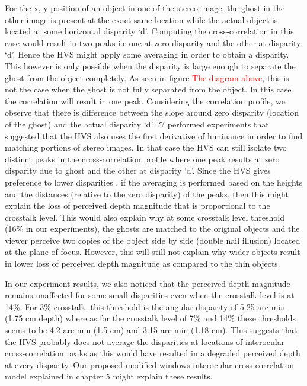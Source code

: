For the x, y position of an object in one of the stereo image, the ghost in the other image is present at the exact same location while the actual object is located at some horizontal disparity `d'. Computing the cross-correlation in this case would result in two peaks i.e one at zero disparity and the other at disparity `d'. Hence the HVS might apply some averaging in order to obtain a disparity. This however is only possible when the disparity is large enough to separate the ghost from the object completely. As seen in figure \textcolor{red}{The diagram above}, this is not the case when the ghost is not fully separated from the object. In this case the correlation will result in one peak. Considering the correlation profile, we observe that there is difference between the slope around zero disparity (location of the ghost) and the actual disparity `d'. ?? performed experiments that suggested that the HVS also uses the first derivative of luminance in order to find matching portions of stereo images. In that case the HVS can still isolate two distinct peaks in the cross-correlation profile where one peak results at zero disparity due to ghost and the other at disparity `d'. Since the HVS gives preference to lower disparities \cite{krol1980double}, if the averaging is performed based on the heights and the distances (relative to the zero disparity) of the peaks, then this might explain the loss of perceived depth magnitude that is proportional to the crosstalk level. This would also explain why at some crosstalk level threshold (16\% in our experiments), the ghosts are matched to the original objects and the viewer perceive two copies of the object side by side (double nail illusion) located at the plane of focus. However, this will still not explain why wider objects result in lower loss of perceived depth magnitude as compared to the thin objects.

In our experiment results, we also noticed that the perceived depth magnitude remains unaffected for some small disparities even when the crosstalk level is at 14\%. For 3\% crosstalk, this threshold is the angular disparity of 5.25 arc min (1.75 cm depth) where as for the crosstalk level of 7\% and 14\% these thresholds seems to be 4.2 arc min (1.5 cm) and 3.15 arc min (1.18 cm). This suggests that the HVS probably does not average the disparities at locations of interocular cross-correlation peaks as this would have resulted in a degraded perceived depth at every disparity. Our proposed modified windows interocular cross-correlation model explained in chapter 5 might explain these results.

